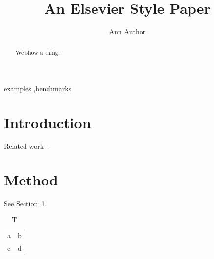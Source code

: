 \documentclass[preprint,12pt]{elsarticle}
\begin{document}
\begin{frontmatter}
\title{An Elsevier Style Paper}
\author[a]{Ann Author}\address[a]{Example University}
\begin{abstract}We show a thing.\end{abstract}
\begin{keyword}examples \sep benchmarks\end{keyword}
\end{frontmatter}
\section{Introduction}\label{s:i}Related work~\cite{knuth84,mittelbach04}.
\section{Method}See Section~\ref{s:i}.
\begin{table}\caption{T}\centering\begin{tabular}{ll}a&b\\c&d\end{tabular}\end{table}

\end{document}
